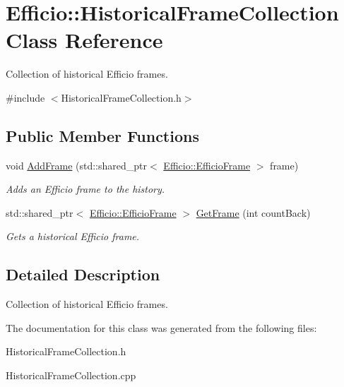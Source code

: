 \hypertarget{class_efficio_1_1_historical_frame_collection}{}\section{Efficio\+:\+:Historical\+Frame\+Collection Class Reference}
\label{class_efficio_1_1_historical_frame_collection}


Collection of historical Efficio frames.  




{\ttfamily \#include $<$Historical\+Frame\+Collection.\+h$>$}

\subsection*{Public Member Functions}
\begin{DoxyCompactItemize}
\item 
void \hyperlink{class_efficio_1_1_historical_frame_collection_a8bb93d37d7d634413626c52b5e8d1ea6}{Add\+Frame} (std\+::shared\+\_\+ptr$<$ \hyperlink{class_efficio_1_1_efficio_frame}{Efficio\+::\+Efficio\+Frame} $>$ frame)\hypertarget{class_efficio_1_1_historical_frame_collection_a8bb93d37d7d634413626c52b5e8d1ea6}{}\label{class_efficio_1_1_historical_frame_collection_a8bb93d37d7d634413626c52b5e8d1ea6}

\begin{DoxyCompactList}\small\item\em Adds an Efficio frame to the history. \end{DoxyCompactList}\item 
std\+::shared\+\_\+ptr$<$ \hyperlink{class_efficio_1_1_efficio_frame}{Efficio\+::\+Efficio\+Frame} $>$ \hyperlink{class_efficio_1_1_historical_frame_collection_abe5a246b4249f9596aae3cbcf04953b5}{Get\+Frame} (int count\+Back)\hypertarget{class_efficio_1_1_historical_frame_collection_abe5a246b4249f9596aae3cbcf04953b5}{}\label{class_efficio_1_1_historical_frame_collection_abe5a246b4249f9596aae3cbcf04953b5}

\begin{DoxyCompactList}\small\item\em Gets a historical Efficio frame. \end{DoxyCompactList}\end{DoxyCompactItemize}


\subsection{Detailed Description}
Collection of historical Efficio frames. 

The documentation for this class was generated from the following files\+:\begin{DoxyCompactItemize}
\item 
Historical\+Frame\+Collection.\+h\item 
Historical\+Frame\+Collection.\+cpp\end{DoxyCompactItemize}
